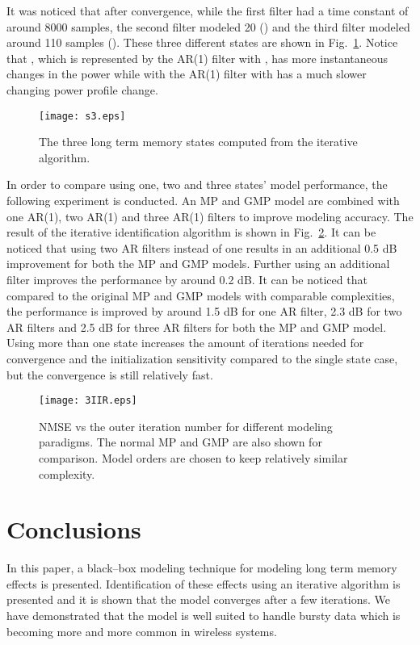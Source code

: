 \documentclass[journal]{IEEEtran}
\begin{document}
It was noticed that after convergence, while the first filter had a time constant of around 8000 samples, the second filter modeled 20 () and the third filter modeled around 110 samples (). These three different states are shown in Fig.~\ref{s3}. Notice that , which is represented by the AR(1) filter with , has more instantaneous changes in the power while  with the AR(1) filter with  has a much slower changing power profile change.
\begin{figure}
\centering
\texttt{[image: s3.eps]}
\caption{The three long term memory states  computed from the iterative algorithm.} \label{s3}
\end{figure}

In order to compare using one, two and three states' model performance, the following experiment is conducted. An MP and GMP model are combined with one AR(1), two AR(1) and three AR(1) filters to improve modeling accuracy. The result of the iterative identification algorithm is shown in Fig.~\ref{3IIR}. It can be noticed that using two AR filters instead of one results in an additional 0.5 dB improvement for both the MP and GMP models. Further using an additional filter improves the performance by around 0.2 dB. It can be noticed that compared to the original MP and GMP models with comparable complexities, the performance is improved by around 1.5 dB for one AR filter, 2.3 dB for two AR filters and 2.5 dB for three AR filters for both the MP and GMP model. Using more than one state increases the amount of iterations needed for convergence and the initialization sensitivity compared to the single state case, but the convergence is still relatively fast.
\begin{figure}
\centering
\texttt{[image: 3IIR.eps]}
\caption{NMSE vs the outer iteration number for different modeling paradigms. The normal MP and GMP are also shown for comparison. Model orders are chosen to keep relatively similar complexity.} \label{3IIR}
\end{figure}

\section{Conclusions}
In this paper, a black--box modeling technique for modeling long term memory effects is presented. Identification of these effects using an iterative algorithm is presented and it is shown that the model converges after a few iterations. We have demonstrated that the model is well suited to handle bursty data which is becoming more and more common in wireless systems.
\end{document}
